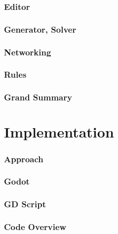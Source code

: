 \documentclass{beamer}
\begin{document}
\begin{frame}
    \frametitle{Editor} %
\end{frame}

\begin{frame}
    \frametitle{Generator, Solver} %
\end{frame}

\begin{frame}
    \frametitle{Networking} %
\end{frame}

\begin{frame}
    \frametitle{Rules} %
\end{frame}

\begin{frame}
    \frametitle{Grand Summary} %
\end{frame}


\section{Implementation}
\begin{frame}
  \frametitle{Approach} %
\end{frame}

\begin{frame}
    \frametitle{Godot} %
\end{frame}

\begin{frame}
    \frametitle{GD Script} %
\end{frame}

\begin{frame}
    \frametitle{Code Overview} %
\end{frame}
\end{document}
